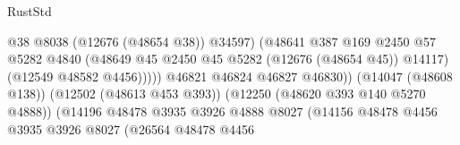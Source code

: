 \begin{lexlean}{RustStd}
\begin{coremodule}
                                                            @38
                                                            @8038
                                                            (@12676 (@48654 @38))
                                                            @34597)
                                                          (@48641
                                                            @387
                                                            @169
                                                            @2450
                                                            @57
                                                            @5282
                                                            @4840
                                                            (@48649
                                                              @45
                                                              @2450
                                                              @45
                                                              @5282
                                                              (@12676 (@48654 @45))
                                                              @14117)
                                                            (@12549 @48582 @4456)))))
                                                    @46821
                                                    @46824
                                                    @46827
                                                    @46830))
                                                (@14047 (@48608 @138))
                                                (@12502 (@48613 @453 @393))
                                                (@12250 (@48620 @393 @140 @5270 @4888))
                                                (@14196
                                                  @48478
                                                  @3935
                                                  @3926
                                                  @4888
                                                  @8027
                                                  (@14156
                                                    @48478
                                                    @4456
                                                    @3935
                                                    @3926
                                                    @8027
                                                    (@26564
                                                      @48478
                                                      @4456

\end{coremodule}
\end{lexlean}
